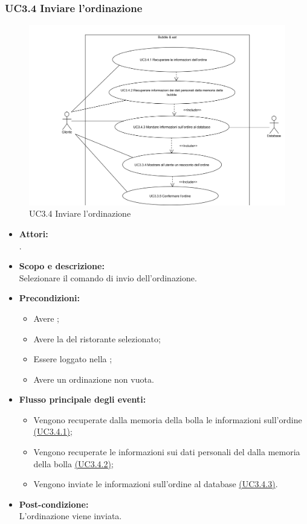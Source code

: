 \subsubsection{UC3.4 Inviare l'ordinazione} \label{UC3.4}

\begin{figure}[H]
	\centering
	\includegraphics[width=15cm]{../../documenti/AnalisiDeiRequisiti/Diagrammi_img/uc3_4.png}
	\caption{UC3.4 Inviare l'ordinazione}
\end{figure}

\begin{itemize}
	\item \textbf{Attori:}
	\\.
	\item \textbf{Scopo e descrizione:} 
	\\Selezionare il comando di invio dell'ordinazione.
	\item \textbf{Precondizioni:}
	\begin{itemize}
		\item Avere ;
		\item Avere la  del ristorante selezionato;
		\item Essere loggato nella ;
		\item Avere un ordinazione non vuota.
	\end{itemize}
	\item \textbf{Flusso principale degli eventi:}
	\begin{itemize}
		\item Vengono recuperate dalla memoria della bolla le informazioni sull'ordine \hyperref[UC3.4.1]{(UC3.4.1)};
		\item Vengono recuperate le informazioni sui dati personali del  dalla memoria della bolla \hyperref[UC3.4.2]{(UC3.4.2)};
		\item Vengono inviate le informazioni sull'ordine al database \hyperref[UC3.4.3]{(UC3.4.3)}.
	\end{itemize}
	\item \textbf{Post-condizione:}
	\\L'ordinazione viene inviata.
\end{itemize}

